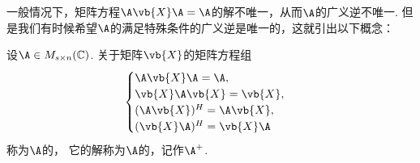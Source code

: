 一般情况下，矩阵方程\(\A \vb{X} \A = \A\)的解不唯一，从而\(\A\)的广义逆不唯一.
但是我们有时候希望\(\A\)的满足特殊条件的广义逆是唯一的，这就引出以下概念：
\begin{definition}
设\(\A \in M_{s \times n}(\mathbb{C})\).
关于矩阵\(\vb{X}\)的矩阵方程组\begin{equation}\label{equation:线性方程组.彭罗斯方程组}
	\begin{cases}
		\A \vb{X} \A = \A, \\
		\vb{X}\A\vb{X}=\vb{X}, \\
		(\A\vb{X})^H = \A\vb{X}, \\
		(\vb{X}\A)^H = \vb{X}\A
	\end{cases}
\end{equation}
称为\(\A\)的，
它的解称为\(\A\)的，记作\(\A^+\).
\end{definition}

